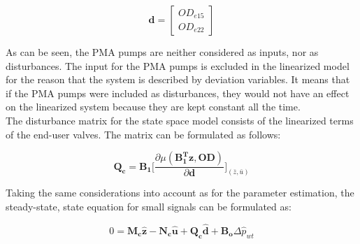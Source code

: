 \begin{equation}
\pmb{d} =
\begin{bmatrix} 
OD_{e15} \\
OD_{e22} 
\label{disturbancevector_control}
\end{bmatrix} 
\end{equation}

%
%
%
As can be seen, the PMA pumps are neither considered as inputs, nor as disturbances. The input for the PMA pumps is excluded in the linearized model for the reason that the system is described by deviation variables. It means that if the PMA pumps were included as disturbances, they would not have an effect on the linearized system because they are kept constant all the time. 
\\
The disturbance matrix for the state space model consists of the linearized terms of the end-user valves. The matrix can be formulated as follows: 

\begin{equation}
  \pmb{Q_c} = \pmb{B_1} \bigg[ \frac{\partial{\mu(\pmb{{B_1^{T}}}\pmb{z}, \pmb{OD})}}{{\partial{\pmb{d}}}}  \bigg]_{(\bar{z}, \bar{u})}  
\label{disturbance_matrix}
\end{equation}

Taking the same considerations into account as for the parameter estimation, the steady-state, state equation for small signals can be formulated as: 

 \begin{equation}
 0 = \pmb{M_c} \pmb{\hat{z}} - \pmb{N_c} \pmb{\hat{u}} + \pmb{Q_c} \pmb{\hat{d}} + \pmb{B_o} \Delta \hat{p}_{wt}    
 \label{statespace_control_sys}
\end{equation}

